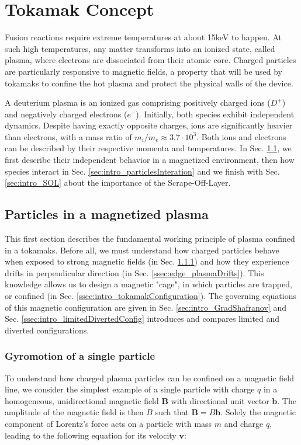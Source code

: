 \chapter{Tokamak Concept}
\label{chap:TokamakConcept}
Fusion reactions require extreme temperatures at about 15keV to happen. At such high temperatures, any matter transforms into an ionized state, called plasma, where electrons are dissociated from their atomic core. Charged particles are particularly responsive to magnetic fields, a property that will be used by tokamaks to confine the hot plasma and protect the physical walls of the device. 

A deuterium plasma is an ionized gas comprising positively charged ions ($D^+$) and negatively charged electrons ($e^-$). Initially, both species exhibit independent dynamics. Despite having exactly opposite charges, ions are significantly heavier than electrons, with a mass ratio of $m_i/m_e \approx 3.7\cdot 10^3$. Both ions and electrons can be described by their respective momenta and temperatures. In Sec. \ref{sec:intro_particlesInPlasma}, we first describe their independent behavior in a magnetized environment, then how species interact in Sec. \ref{sec:intro_particlesInteration} and we finish with Sec. \ref{sec:intro_SOL} about the importance of the Scrape-Off-Layer.


\section{Particles in a magnetized plasma}
\label{sec:intro_particlesInPlasma}

This first section describes the fundamental working principle of plasma confined in a tokamaks. Before all, we must understand how charged particles behave when exposed to strong magnetic fields (in Sec. \ref{ssec:intro_magneticConfinement}) and how they experience drifts in perpendicular direction (in Sec. \ref{ssec:edge_plasmaDrifts}). This knowledge allows us to design a magnetic "cage", in which particles are trapped, or confined (in Sec. \ref{ssec:intro_tokamakConfiguration}). The governing equations of this magnetic configuration are given in Sec. \ref{sec:intro_GradShafranov} and Sec. \ref{ssec:intro_limitedDivertedConfig} introduces and compares limited and diverted configurations.

\subsection{Gyromotion of a single particle}
\label{ssec:intro_magneticConfinement}
To understand how charged plasma particles can be confined on a magnetic field line, we consider the simplest example of a single particle with charge \( q \) in a homogeneous, unidirectional magnetic field \(\textbf{B}\) with directional unit vector \(\textbf{b}\). The amplitude of the magnetic field is then $B$ such that $\mathbf{B} = B\mathbf{b}$. Solely the magnetic component of Lorentz's force acts on a particle with mass \( m \) and charge \( q \), leading to the following equation for its velocity \(\textbf{v}\):

